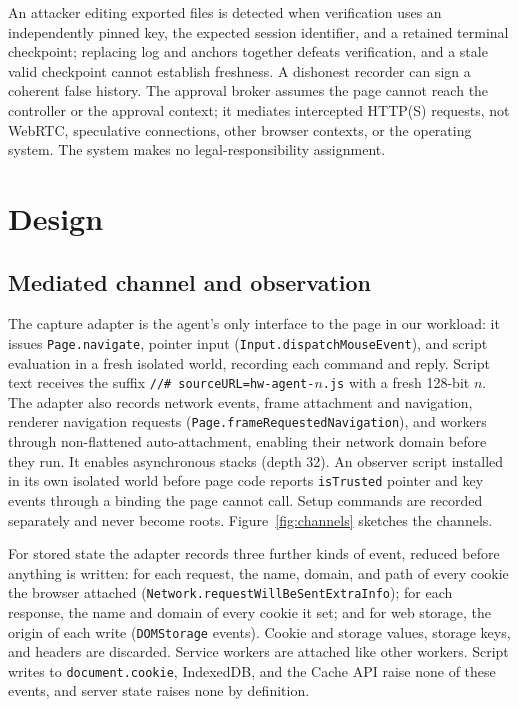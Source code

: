 \documentclass[11pt]{article}
\theoremstyle{definition}
\begin{document}
An attacker editing exported files is detected when verification uses an
independently pinned key, the expected session identifier, and a retained terminal
checkpoint; replacing log and anchors together defeats verification, and a stale
valid checkpoint cannot establish freshness. A dishonest recorder can sign a
coherent false history. The approval broker assumes the page cannot reach the
controller or the approval context; it mediates intercepted HTTP(S) requests, not
WebRTC, speculative connections, other browser contexts, or the operating system.
The system makes no legal-responsibility assignment.

\section{Design}\label{sec:design}
\subsection{Mediated channel and observation}
The capture adapter is the agent's only interface to the page in our workload:
it issues \texttt{Page.navigate}, pointer input
(\texttt{Input.\allowbreak dispatchMouseEvent}), and script evaluation in a fresh isolated
world, recording each command and reply. Script text receives the suffix
\texttt{//\#~sourceURL=\allowbreak hw-agent-}$n$\texttt{.js} with a fresh 128-bit $n$. The adapter
also records network events, frame attachment and navigation, renderer navigation
requests (\texttt{Page.\allowbreak frameRequestedNavigation}), and workers through
non-flattened auto-attachment, enabling their network domain before they run. It
enables asynchronous stacks (depth 32). An observer script installed in its own
isolated world before page code reports \texttt{isTrusted} pointer and key events
through a binding the page cannot call. Setup commands are recorded separately
and never become roots. Figure~\ref{fig:channels} sketches the channels.

For stored state the adapter records three further kinds of event, reduced
before anything is written: for each request, the name, domain, and path of
every cookie the browser attached
(\texttt{Network.\allowbreak requestWillBeSentExtraInfo}); for each response, the name and
domain of every cookie it set; and for web storage, the origin of each write
(\texttt{DOMStorage} events). Cookie and storage values, storage keys, and
headers are discarded. Service workers are attached like other workers. Script
writes to \texttt{document.cookie}, IndexedDB, and the Cache API raise none of
these events, and server state raises none by definition.
\end{document}
